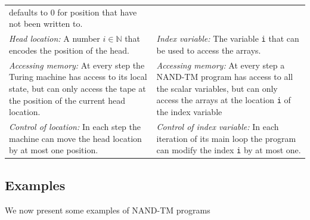 \begin{longtable}[]{@{}ll@{}}
\begin{minipage}[t]{0.53\columnwidth}
defaults to \(0\) for position that have not been written to.\strut
\end{minipage}\tabularnewline
\begin{minipage}[t]{0.41\columnwidth}\raggedright
\emph{Head location:} A number \(i\in \mathbb{N}\) that encodes the
position of the head.\strut
\end{minipage} & \begin{minipage}[t]{0.53\columnwidth}\raggedright
\emph{Index variable:} The variable \texttt{i} that can be used to
access the arrays.\strut
\end{minipage}\tabularnewline
\begin{minipage}[t]{0.41\columnwidth}\raggedright
\emph{Accessing memory:} At every step the Turing machine has access to
its local state, but can only access the tape at the position of the
current head location.\strut
\end{minipage} & \begin{minipage}[t]{0.53\columnwidth}\raggedright
\emph{Accessing memory:} At every step a NAND-TM program has access to
all the scalar variables, but can only access the arrays at the location
\texttt{i} of the index variable\strut
\end{minipage}\tabularnewline
\begin{minipage}[t]{0.41\columnwidth}\raggedright
\emph{Control of location:} In each step the machine can move the head
location by at most one position.\strut
\end{minipage} & \begin{minipage}[t]{0.53\columnwidth}\raggedright
\emph{Control of index variable:} In each iteration of its main loop the
program can modify the index \texttt{i} by at most one.\strut
\end{minipage}\tabularnewline
\bottomrule
\end{longtable}

\label{TMvsNANDTMtable}

\subsection{Examples}\label{Examples}

We now present some examples of NAND-TM programs

\hypertarget{XORENANDPP}{}

